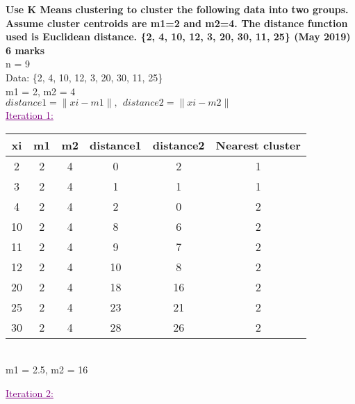 \textbf{\textcolor{LightMagenta}{Use K Means clustering to cluster the following data into two groups. Assume cluster centroids are m1=2 and m2=4. The distance function used is Euclidean distance. \{2, 4, 10, 12, 3, 20, 30, 11, 25\} (May 2019) \hfill 6 marks}} \\[5pt]

n = 9  \\
Data: \{2, 4, 10, 12, 3, 20, 30, 11, 25\} \\
m1 = 2, m2 = 4 \\
\begin{math} distance1 = \|xi - m1\|, \hspace{5pt} distance2 = \|xi - m2\| \end{math}\\

\textcolor{purple}{\underline{Iteration 1:}} \\

\begin{tabular} {|c|c|c|c|c|c|}
    \hline
        xi & m1 & m2 & distance1 & distance2 & Nearest cluster \\
        \hline
        \hline
        2 & 2 & 4 & 0 & 2 & 1\\
        \hline
        3 & 2 & 4 & 1 & 1 & 1\\
        \hline
        4 & 2 & 4 & 2 & 0 & 2\\
        \hline
        10 & 2 & 4 & 8 & 6 & 2\\
        \hline
        11 & 2 & 4 & 9 & 7 & 2\\
        \hline
        12 & 2 & 4 & 10 & 8 & 2\\
        \hline
        20 & 2 & 4 & 18 & 16 & 2\\
        \hline
        25 & 2 & 4 & 23 & 21 & 2\\
        \hline
        30 & 2 & 4 & 28 & 26 & 2\\
        \hline 
    \end{tabular}
\\ [5pt]
m1 = 2.5, m2 = 16

\textcolor{purple}{\underline{Iteration 2:}} \\

